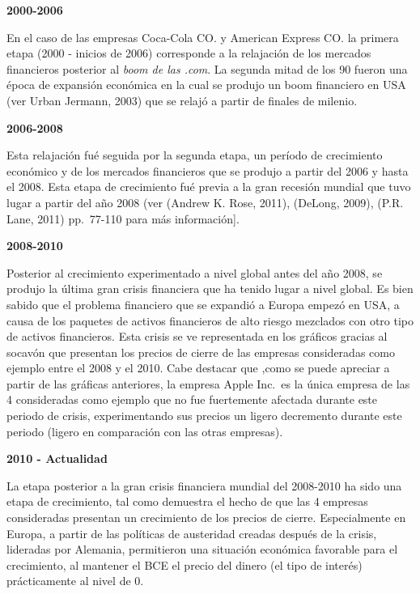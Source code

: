 \documentclass[]{DissertateUSU}
\begin{document}
\textbf{2000-2006}

\noindent En el caso de las empresas Coca-Cola CO. y American Express
CO. la primera etapa (2000 - inicios de 2006) corresponde a la
relajación de los mercados financieros posterior al \emph{boom de las
.com}. La segunda mitad de los 90 fueron una época de expansión
económica en la cual se produjo un boom financiero en USA (ver Urban
Jermann, 2003) que se relajó a partir de finales de milenio.

\textbf{2006-2008}

\noindent Esta relajación fué seguida por la segunda etapa, un período
de crecimiento económico y de los mercados financieros que se produjo a
partir del 2006 y hasta el 2008. Esta etapa de crecimiento fué previa a
la gran recesión mundial que tuvo lugar a partir del año 2008 (ver
(Andrew K. Rose, 2011), (DeLong, 2009), (P.R. Lane, 2011) pp.~77-110
para más información{]}.

\textbf{2008-2010}

\noindent Posterior al crecimiento experimentado a nivel global antes
del año 2008, se produjo la última gran crisis financiera que ha tenido
lugar a nivel global. Es bien sabido que el problema financiero que se
expandió a Europa empezó en USA, a causa de los paquetes de activos
financieros de alto riesgo mezclados con otro tipo de activos
financieros. Esta crisis se ve representada en los gráficos gracias al
socavón que presentan los precios de cierre de las empresas consideradas
como ejemplo entre el 2008 y el 2010. Cabe destacar que ,como se puede
apreciar a partir de las gráficas anteriores, la empresa Apple Inc.~es
la única empresa de las 4 consideradas como ejemplo que no fue
fuertemente afectada durante este periodo de crisis, experimentando sus
precios un ligero decremento durante este periodo (ligero en comparación
con las otras empresas).

\textbf{2010 - Actualidad}

\noindent La etapa posterior a la gran crisis financiera mundial del
2008-2010 ha sido una etapa de crecimiento, tal como demuestra el hecho
de que las 4 empresas consideradas presentan un crecimiento de los
precios de cierre. Especialmente en Europa, a partir de las políticas de
austeridad creadas después de la crisis, lideradas por Alemania,
permitieron una situación económica favorable para el crecimiento, al
mantener el BCE el precio del dinero (el tipo de interés) prácticamente
al nivel de 0.

\setlength\parskip{5ex}
\justifying
\end{document}
